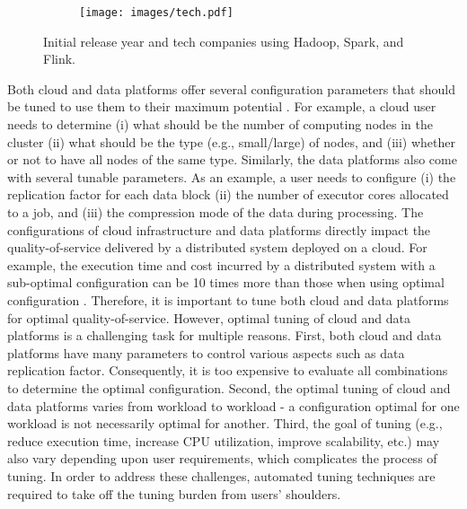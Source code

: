 \documentclass[3p]{elsarticle}
\begin{document}
\begin{figure}[h]
\captionsetup{justification=centering}
\centering
  \begin{subfigure}{0.7\textwidth}
  \centering
  \texttt{[image: images/tech.pdf]}
\end{subfigure}
\caption{Initial release year and tech companies using Hadoop, Spark, and Flink.} 
\label{tech}
\vspace{-1.5 em}
\end{figure}

  

Both cloud and data platforms offer several configuration parameters that should be tuned to use them to their maximum potential \cite{herodotou2020survey}. For example, a cloud user needs to determine (i) what should be the number of computing nodes in the cluster (ii) what should be the type (e.g., small/large) of nodes, and (iii) whether or not to have all nodes of the same type. Similarly, the data platforms also come with several tunable parameters. As an example, a user needs to configure (i) the replication factor for each data block (ii) the number of executor cores allocated to a job, and (iii) the compression mode of the data during processing. The configurations of cloud infrastructure and data platforms directly impact the quality-of-service delivered by a distributed system deployed on a cloud. For example, the execution time and cost incurred by a distributed system with a sub-optimal configuration can be 10 times more than those when using optimal configuration \cite{hsu2018scout}. Therefore, it is important to tune both cloud and data platforms for optimal quality-of-service. However, optimal tuning of cloud and data platforms is a challenging task for multiple reasons. First, both cloud and data platforms have many parameters to control various aspects such as data replication factor. Consequently, it is too expensive to evaluate all combinations to determine the optimal configuration. Second, the optimal tuning of cloud and data platforms varies from workload to workload - a configuration optimal for one workload is not necessarily optimal for another. Third, the goal of tuning (e.g., reduce execution time, increase CPU utilization, improve scalability, etc.) may also vary depending upon user requirements, which complicates the process of tuning. In order to address these challenges, automated tuning techniques are required to take off the tuning burden from users' shoulders.
\end{document}
